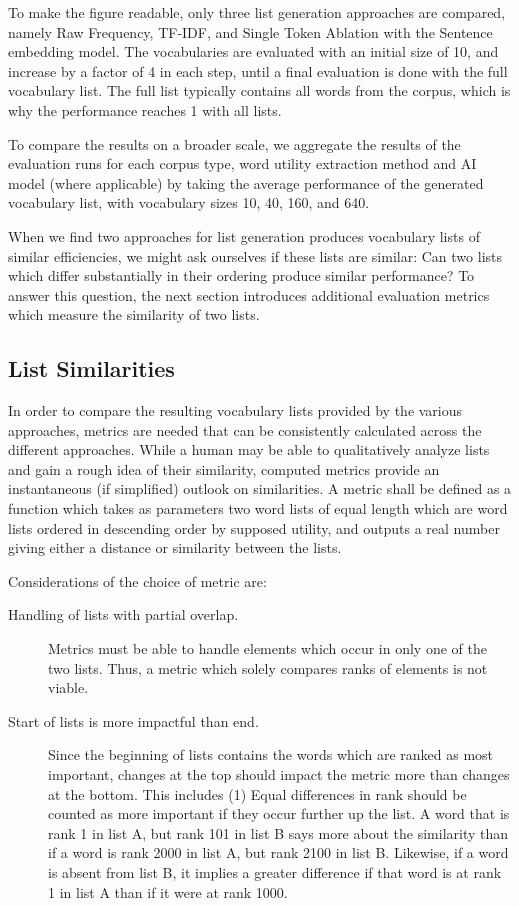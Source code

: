 To make the figure readable, only three list generation approaches are compared, namely Raw Frequency, TF-IDF, and Single Token Ablation with the Sentence embedding model.
The vocabularies are evaluated with an initial size of 10, and increase by a factor of 4 in each step, until a final evaluation is done with the full vocabulary list.
The full list typically contains all words from the corpus, which is why the performance reaches 1 with all lists.

To compare the results on a broader scale, we aggregate the results of the evaluation runs for each corpus type, word utility extraction method and AI model (where applicable) by taking the average performance of the generated vocabulary list, with vocabulary sizes 10, 40, 160, and 640.


When we find two approaches for list generation produces vocabulary lists of similar efficiencies, we might ask ourselves if these lists are similar:
Can two lists which differ substantially in their ordering produce similar performance?
To answer this question, the next section introduces additional evaluation metrics which measure the similarity of two lists.

\subsection{List Similarities}
In order to compare the resulting vocabulary lists provided by the various approaches, metrics are needed that can be consistently calculated across the different approaches.
While a human may be able to qualitatively analyze lists and gain a rough idea of their similarity, computed metrics provide an instantaneous (if simplified) outlook on similarities.
A metric shall be defined as a function which takes as parameters two word lists of equal length which are word lists ordered in descending order by supposed utility, and outputs a real number giving either a distance or similarity between the lists.

Considerations of the choice of metric are:

\begin{description}
	\item [Handling of lists with partial overlap.]
	      Metrics must be able to handle elements which occur in only one of the two lists.
	      Thus, a metric which solely compares ranks of elements is not viable.
	\item [Start of lists is more impactful than end.]
	      Since the beginning of lists contains the words which are ranked as most important, changes at the top should impact the metric more than changes at the bottom. This includes (1) Equal differences in rank should be counted as more important if they occur further up the list.
	      A word that is rank 1 in list A, but rank 101 in list B says more about the similarity than if a word is rank 2000 in list A, but rank 2100 in list B. Likewise, if a word is absent from list B, it implies a greater difference if that word is at rank 1 in list A than if it were at rank 1000.
\end{description}

